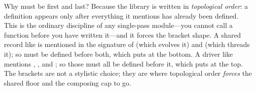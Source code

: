 Why must  be first and  last? Because the library is
written in \emph{topological order}: a definition appears only after everything it
mentions has already been defined. This is the ordinary discipline of any
single-pass module---you cannot call a function before you have written it---and it
forces the bracket shape. A shared record like  is mentioned in the
signature of  (which evolves it) and  (which
threads it); so  must be defined before both, which puts 
at the bottom. A driver like  mentions ,
, and ; so those must all be defined before
it, which puts  at the top. The brackets are not a stylistic choice;
they are where topological order \emph{forces} the shared floor and the composing
cap to go.

